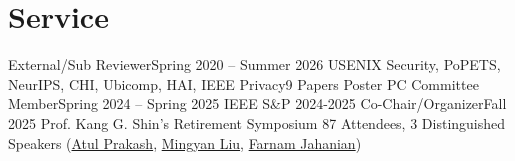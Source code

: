\section{Service}
\CVSubHeadingListStart
    \CVSubheading
      {External/Sub Reviewer}{Spring 2020 -- Summer 2026}
      {USENIX Security, PoPETS, NeurIPS, CHI, Ubicomp, HAI, IEEE Privacy}{9 Papers}
    \CVSubheading
    {Poster PC Committee Member}{Spring 2024 -- Spring 2025}
      {IEEE S\&P 2024-2025}{}
    \CVSubheadingLong
    {Co-Chair/Organizer}{Fall 2025}
      {Prof. Kang G. Shin's Retirement Symposium}{}
      {87 Attendees, 3 Distinguished Speakers (\href{https://web.eecs.umich.edu/~aprakash/}{Atul Prakash}, \href{https://en.wikipedia.org/wiki/Mingyan_Liu}{Mingyan Liu}, \href{https://en.wikipedia.org/wiki/Farnam_Jahanian}{Farnam Jahanian})}{}
  \CVSubHeadingListEnd